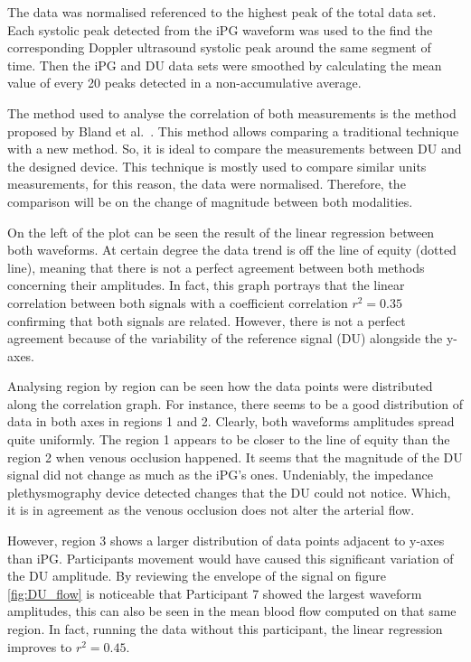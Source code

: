The data was normalised referenced to the highest peak of the total data set.  Each systolic peak detected from the iPG waveform was used to the find the corresponding Doppler ultrasound systolic peak around the same segment of time. Then the iPG and DU data sets were smoothed by calculating the mean value of every 20 peaks detected in a non-accumulative average.  

The method used to analyse the correlation of both measurements is the method proposed by Bland et al.~\cite{bland1986statistical}. This method allows comparing a traditional technique with a new method. So, it is ideal to compare the measurements between DU and the designed device. This technique is mostly used to compare similar units measurements, for this reason, the data were normalised. Therefore, the comparison will be on the change of magnitude between both modalities.

On the left of the plot can be seen the result of the linear regression between both waveforms. At certain degree the data trend is off the line of equity (dotted line), meaning that there is not a perfect agreement between both methods concerning their amplitudes. In fact, this graph portrays that the linear correlation between both signals with a coefficient correlation  $r^2 = 0.35$ confirming that both signals are related. However, there is not a perfect agreement because of the variability of the reference signal (DU) alongside the y-axes. 

Analysing region by region can be seen how the data points were distributed along the correlation graph. For instance, there seems to be a good distribution of data in both axes in regions 1 and 2. Clearly, both waveforms amplitudes spread quite uniformly. The region 1 appears to be closer to the line of equity than the region 2 when venous occlusion happened. It seems that the magnitude of the DU signal did not change as much as the iPG's ones. Undeniably, the impedance plethysmography device detected changes that the DU could not notice. Which, it is in agreement as the venous occlusion does not alter the arterial flow. 

However, region 3 shows a larger distribution of data points adjacent to y-axes than iPG. Participants movement would have caused this significant variation of the DU amplitude. By reviewing the envelope of the signal on figure \ref{fig:DU_flow} is noticeable that Participant 7 showed the largest waveform amplitudes, this can also be seen in the mean blood flow computed on that same region. In fact, running the data without this participant, the linear regression improves to $r^2 = 0.45$. 

